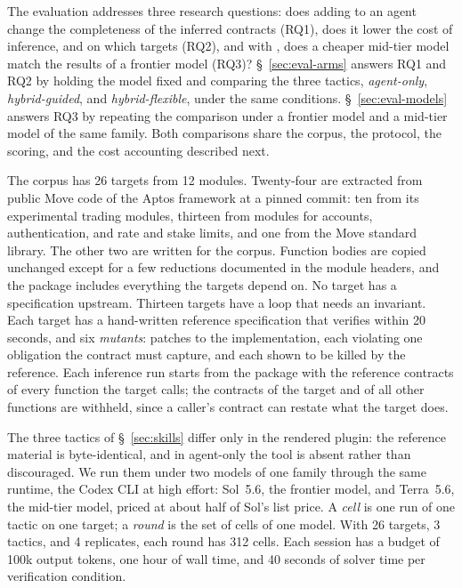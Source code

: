 \label{sec:evaluation}

The evaluation addresses three research questions: does adding \WP to an agent change the completeness of the inferred contracts (RQ1), does it lower the cost of inference, and on which targets (RQ2), and with \WP, does a cheaper mid-tier model match the results of a frontier model (RQ3)?
\S~\ref{sec:eval-arms} answers RQ1 and RQ2 by holding the model fixed and comparing the three tactics, \textit{agent-only}, \textit{hybrid-guided}, and \textit{hybrid-flexible}, under the same conditions.
\S~\ref{sec:eval-models} answers RQ3 by repeating the comparison under a frontier model and a mid-tier model of the same family.
Both comparisons share the corpus, the protocol, the scoring, and the cost accounting described next.

\label{sec:eval-setup}

The corpus has 26 targets from 12 modules.
Twenty-four are extracted from public Move code of the Aptos framework at a pinned commit: ten from its experimental trading modules, thirteen from modules for accounts, authentication, and rate and stake limits, and one from the Move standard library.
The other two are written for the corpus.
Function bodies are copied unchanged except for a few reductions documented in the module headers, and the package includes everything the targets depend on.
No target has a specification upstream.
Thirteen targets have a loop that needs an invariant.
Each target has a hand-written reference specification that verifies within 20 seconds, and six \emph{mutants}: patches to the implementation, each violating one obligation the contract must capture, and each shown to be killed by the reference.
Each inference run starts from the package with the reference contracts of every function the target calls; the contracts of the target and of all other functions are withheld, since a caller's contract can restate what the target does.

The three tactics of \S~\ref{sec:skills} differ only in the rendered plugin: the reference material is byte-identical, and in agent-only the \WP tool is absent rather than discouraged.
We run them under two models of one family through the same runtime, the Codex CLI at high effort: Sol~5.6, the frontier model, and Terra~5.6, the mid-tier model, priced at about half of Sol's list price.
A \emph{cell} is one run of one tactic on one target; a \emph{round} is the set of cells of one model.
With 26 targets, 3 tactics, and 4 replicates, each round has 312 cells.
Each session has a budget of 100k output tokens, one hour of wall time, and 40 seconds of solver time per verification condition.

